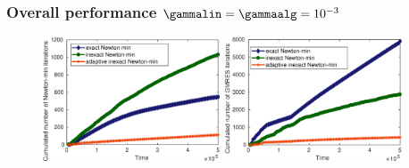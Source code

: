 \documentclass[10 pt]{beamer}
\begin{document}
\begin{frame}
\frametitle{Overall performance $\gammalin = \gammaalg = 10^{-3}$}
\begin{figure}
\centering
\includegraphics[width=0.47\textwidth]{image/Cumulated_number_Newton_iterations_three_methods_Nx_1000}
\hspace{0.6 cm}
\includegraphics[width=0.47\textwidth]{image/Cumulated_number_gmres_iterations_three_methods_Nx_1000}
\end{figure}
\end{frame}
\end{document}
